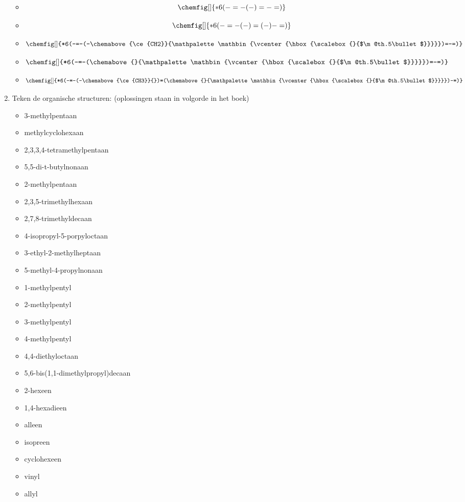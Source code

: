 \documentclass[a4paper,12pt]{article}
\makeatletter
\newcommand*\bigcdot{\mathpalette\bigcdot@{.5}}
\newcommand*\bigcdot@[2]{\mathbin{\vcenter{\hbox{\scalebox{#2}{$\m@th#1\bullet$}}}}}
\makeatother
\begin{document}
\begin{enumerate}
\begin{itemize}
                \item $$\chemfig[]{*6(-=-(-)=-=)}$$
                \item $$\chemfig[]{*6(-=-(-)=(-)-=)}$$
                \item $$\chemfig[]{*6(-=-(-\chemabove{\ce{CH2}}{\bigcdot{}})=-=)}$$
                \item $$\chemfig[]{*6(-=-(\chemabove{}{\bigcdot{}})=-=)}$$
                \item $$\chemfig[]{*6(-=-(-\chemabove{\ce{CH3}}{})=(\chemabove{}{\bigcdot{}})-=)}$$
            \end{itemize}
        \item Teken de organische structuren: (oplossingen staan in volgorde in het boek)
            \begin{itemize}
                \item 3-methylpentaan
                \item methylcyclohexaan
                \item 2,3,3,4-tetramethylpentaan
                \item 5,5-di-t-butylnonaan
                \item 2-methylpentaan
                \item 2,3,5-trimethylhexaan
                \item 2,7,8-trimethyldecaan
                \item 4-isopropyl-5-porpyloctaan
                \item 3-ethyl-2-methylheptaan
                \item 5-methyl-4-propylnonaan
                \item 1-methylpentyl
                \item 2-methylpentyl
                \item 3-methylpentyl
                \item 4-methylpentyl
                \item 4,4-diethyloctaan
                \item 5,6-bis(1,1-dimethylpropyl)decaan
                \item 2-hexeen
                \item 1,4-hexadieen
                \item alleen 
                \item isopreen
                \item cyclohexeen
                \item vinyl
                \item allyl

\end{itemize}
\end{enumerate}
\end{document}
